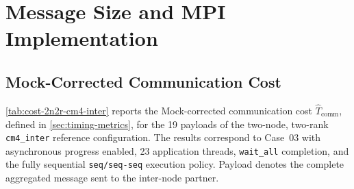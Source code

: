 \section{Message Size and MPI Implementation}

\subsection{Mock-Corrected Communication Cost}

\autoref{tab:cost-2n2r-cm4-inter} reports the Mock-corrected communication
cost $\widehat{T}_{\mathrm{comm}}$, defined in
\autoref{sec:timing-metrics}, for the 19 payloads of the two-node,
two-rank \texttt{cm4\_inter} reference configuration. The results correspond
to Case~03 with asynchronous progress enabled, 23 application threads,
\texttt{wait\_all} completion, and the fully sequential
\texttt{seq/seq-seq} execution policy. Payload denotes the complete
aggregated message sent to the inter-node partner.

